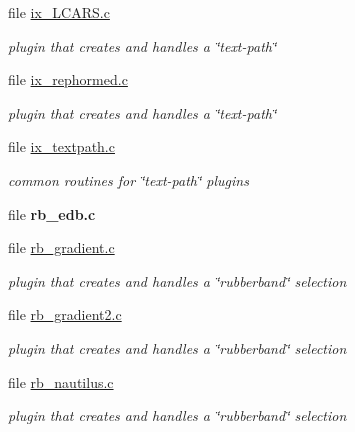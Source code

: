 \begin{CompactItemize}
\item 
file \hyperlink{ix__LCARS_8c}{ix\_\-LCARS.c}
\begin{CompactList}\small\item\em plugin that creates and handles a \char`\"{}text-path\char`\"{} \item\end{CompactList}

\item 
file \hyperlink{ix__rephormed_8c}{ix\_\-rephormed.c}
\begin{CompactList}\small\item\em plugin that creates and handles a \char`\"{}text-path\char`\"{} \item\end{CompactList}

\item 
file \hyperlink{ix__textpath_8c}{ix\_\-textpath.c}
\begin{CompactList}\small\item\em common routines for \char`\"{}text-path\char`\"{} plugins \item\end{CompactList}

\item 
file {\bf rb\_\-edb.c}
\item 
file \hyperlink{rb__gradient_8c}{rb\_\-gradient.c}
\begin{CompactList}\small\item\em plugin that creates and handles a \char`\"{}rubberband\char`\"{} selection \item\end{CompactList}

\item 
file \hyperlink{rb__gradient2_8c}{rb\_\-gradient2.c}
\begin{CompactList}\small\item\em plugin that creates and handles a \char`\"{}rubberband\char`\"{} selection \item\end{CompactList}

\item 
file \hyperlink{rb__nautilus_8c}{rb\_\-nautilus.c}
\begin{CompactList}\small\item\em plugin that creates and handles a \char`\"{}rubberband\char`\"{} selection \item\end{CompactList}


\end{CompactItemize}

